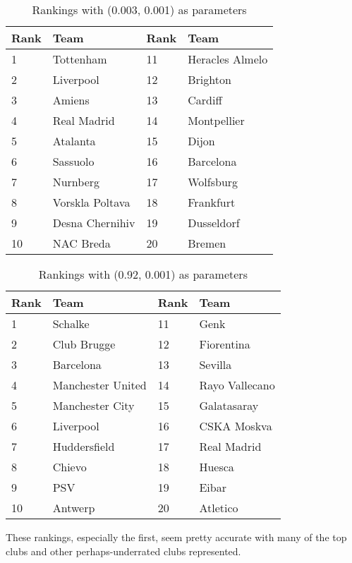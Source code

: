\documentclass[10pt]{article}
\begin{document}
\begin{table}[h!]
\centering
\begin{tabular}{ll|ll}
Rank & Team            & Rank & Team            \\ \hline
1    & Tottenham       & 11   & Heracles Almelo \\
2    & Liverpool       & 12   & Brighton        \\
3    & Amiens          & 13   & Cardiff         \\
4    & Real Madrid     & 14   & Montpellier     \\
5    & Atalanta        & 15   & Dijon           \\
6    & Sassuolo        & 16   & Barcelona       \\
7    & Nurnberg        & 17   & Wolfsburg       \\
8    & Vorskla Poltava & 18   & Frankfurt       \\
9    & Desna Chernihiv & 19   & Dusseldorf      \\
10   & NAC Breda       & 20   & Bremen         
\end{tabular}
\caption{Rankings with (0.003, 0.001) as parameters}
\end{table}
\newpage
\begin{table}[h!]
\centering
\begin{tabular}{ll|ll}
Rank & Team            & Rank & Team            \\ \hline
1    & Schalke       & 11   &  Genk \\
2    & Club Brugge       & 12   & Fiorentina        \\
3    & Barcelona          & 13   & Sevilla         \\
4    & Manchester United    & 14   & Rayo Vallecano     \\
5    & Manchester City        & 15   & Galatasaray           \\
6    & Liverpool        & 16   & CSKA Moskva       \\
7    & Huddersfield        & 17   & Real Madrid       \\
8    & Chievo  & 18   & Huesca       \\
9    & PSV  & 19   & Eibar      \\
10   & Antwerp       & 20   & Atletico         
\end{tabular}
\caption{Rankings with (0.92, 0.001) as parameters}
\end{table}
These rankings, especially the first, seem pretty accurate with many of the top clubs and other perhaps-underrated clubs represented.
\end{document}
